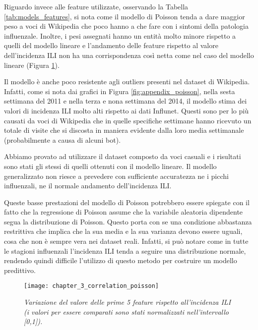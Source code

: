 Riguardo invece alle feature utilizzate, osservando la Tabella \ref{tab:models_features}, si nota come il modello di 
Poisson tenda a dare maggior peso a voci di Wikipedia che poco hanno a che fare con i sintomi della patologia influenzale. 
Inoltre, i pesi assegnati hanno un entità molto minore rispetto a quelli del modello lineare e  
l'andamento delle feature rispetto al valore dell'incidenza ILI non ha una corrispondenza così netta come nel caso del 
modello lineare (Figura \ref{fig:ch_3_correlation_poisson}).
\bigskip

Il modello è anche poco resistente agli outliers presenti nel dataset di Wikipedia. Infatti, come si nota dai 
grafici in Figura \ref{fig:appendix_poisson}, nella sesta settimana del 2011 e
nella terza e nona settimana del 2014, il modello stima dei valori di incidenza ILI molto alti rispetto ai dati Influnet.
Questi sono per lo più causati da voci di Wikipedia che in quelle specifiche settimane hanno ricevuto un totale di visite
che si discosta in maniera evidente dalla loro media settimanale (probabilmente a causa di alcuni bot).
\bigskip 

Abbiamo provato ad utilizzare il dataset composto da voci casuali e i risultati sono stati 
gli stessi di quelli ottenuti con il modello lineare. Il modello generalizzato non riesce a prevedere con sufficiente 
accuratezza ne i picchi influenzali, ne il normale andamento dell'incidenza ILI. 
\bigskip 

Queste basse prestazioni del modello di Poisson potrebbero essere spiegate con il fatto che la regressione di Poisson assume che la variabile aleatoria dipendente segua la distribuzione di Poisson. Questo porta con se una 
condizione abbastanza restrittiva che implica che la sua media e la sua varianza devono essere uguali, cosa che non è sempre 
vera nei dataset reali. Infatti, si può notare come in tutte le stagioni influenzali l'incidenza ILI tenda a seguire una 
distribuzione normale, rendendo quindi difficile l'utilizzo di questo metodo per costruire un modello predittivo.
\bigskip

\begin{figure}[h]
\texttt{[image: chapter\_3\_correlation\_poisson]}
\caption{\textit{Variazione del valore delle prime 5 feature rispetto all'incidenza ILI (i valori per essere comparati sono stati normalizzati nell'intervallo [0,1]).}}
\label{fig:ch_3_correlation_poisson}
\centering
\end{figure}

\clearpage